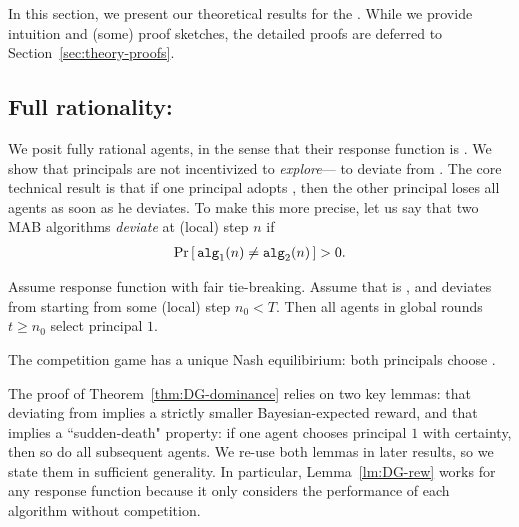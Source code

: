 
In this section, we present our theoretical results for the \TheoryModel. While we provide intuition and (some) proof sketches, the detailed proofs are deferred to Section~\ref{sec:theory-proofs}.


\subsection{Full rationality: \HardMax}
\label{sec:theory-HM}

We posit fully rational agents, in the sense that their response function is \HardMax. We show that principals are not incentivized to \emph{explore}--- \ie to deviate from \DynGreedy. The core technical result is that if one principal adopts \DynGreedy, then the other principal loses all agents as soon as he deviates. To make this more precise, let us say that two MAB algorithms \emph{deviate} at (local) step $n$ if
\begin{align}
\Pr\sbr{ \alg[1](n)\neq \alg[2](n)} >0.
\end{align}





\begin{theorem}\label{thm:DG-dominance}
Assume \HardMax response function with fair tie-breaking. Assume that \alg[1] is \DynGreedy, and \alg[2] deviates from \DynGreedy starting from some (local) step $n_0<T$. Then all agents in global rounds $t\geq n_0$ select principal $1$.
\end{theorem}

\begin{corollary}\label{cor:DG-dominance}
The competition game has a unique Nash equilibirium: both principals choose \DynGreedy.
\end{corollary}

The proof of Theorem~\ref{thm:DG-dominance} relies on two key lemmas: that deviating from \DynGreedy implies a strictly smaller Bayesian-expected reward, and that \HardMax implies a ``sudden-death" property: if one agent chooses principal $1$ with certainty, then so do all subsequent agents. We re-use both lemmas in later results, so we state them in sufficient generality. In particular, Lemma~\ref{lm:DG-rew} works for any response function because it only considers the performance of each algorithm without competition.


